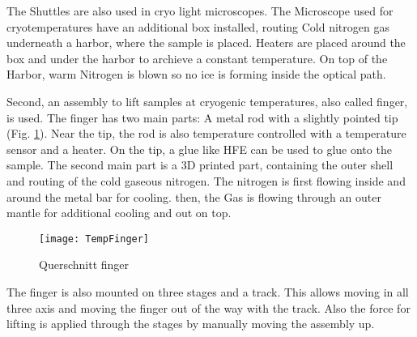 The Shuttles are also used in cryo light microscopes. The Microscope used for cryotemperatures have an additional box installed, routing Cold nitrogen gas underneath a harbor, where the sample is placed. Heaters are placed around the box and under the harbor to archieve a constant temperature. On top of the Harbor, warm Nitrogen is blown so no ice is forming inside the optical path. 

Second, an assembly to lift samples at cryogenic temperatures, also called finger, is used. The finger has two main parts: A metal rod with a slightly pointed tip (Fig. \ref{fig:querschnittfinger}). Near the tip, the rod is also temperature controlled with a temperature sensor and a heater. On the tip, a glue like HFE can be used to glue onto the sample. The second main part is a 3D printed part, containing the outer shell and routing of the cold gaseous nitrogen. The nitrogen is first flowing inside and around the metal bar for cooling. then, the Gas is flowing through an outer mantle for additional cooling and out on top.


\begin{figure}[hbt!]
	\centering
	\texttt{[image: TempFinger]}
	\caption{Querschnitt finger}
	\label{fig:querschnittfinger}
\end{figure}

The finger is also mounted on three stages and a track. This allows moving in all three axis and moving the finger out of the way with the track. Also the force for lifting is applied through the stages by manually moving the assembly up.

